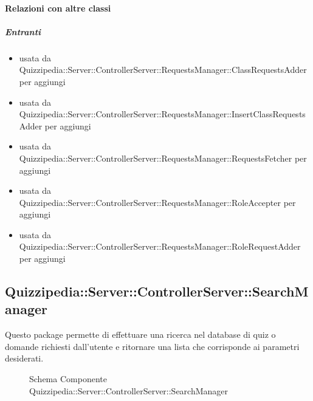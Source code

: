 \paragraph{Relazioni con altre classi}
\subparagraph{Entranti}
\begin{itemize}
\item usata da Quizzipedia::Server::ControllerServer::RequestsManager::ClassRequestsAdder per aggiungi
\item usata da Quizzipedia::Server::ControllerServer::RequestsManager::InsertClassRequestsAdder per aggiungi
\item usata da Quizzipedia::Server::ControllerServer::RequestsManager::RequestsFetcher per aggiungi
\item usata da Quizzipedia::Server::ControllerServer::RequestsManager::RoleAccepter per aggiungi
\item usata da Quizzipedia::Server::ControllerServer::RequestsManager::RoleRequestAdder per aggiungi
\end{itemize}
\subsection{Quizzipedia::Server::ControllerServer::SearchManager}
Questo package permette di effettuare una ricerca nel database di quiz o domande richiesti dall'utente e ritornare una lista che corrisponde ai parametri desiderati.
\begin{figure}[H]
\centering
\noindent{}
\caption[Schema Componente Quizzipedia::Server::ControllerServer::SearchManager]{Schema Componente Quizzipedia::Server::ControllerServer::SearchManager}
\end{figure}
